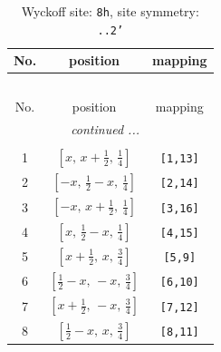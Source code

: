 \documentclass[fleqn,8pt]{jsarticle}
\begin{document}
\begin{longtable}{ccc}
\caption{Wyckoff site: {\tt 8h}, site symmetry: {\tt ..2'}}
 \\
 \hline \hline
No. & position & mapping \\ \hline \endfirsthead

\multicolumn{2}{l}{\tablename\ \thetable{}} \\
 \hline \hline
No. & position & mapping \\ \hline \endhead

 \hline \hline
\multicolumn{2}{r}{\footnotesize\it continued ...} \\ \endfoot

 \hline \hline
\multicolumn{2}{r}{} \\ \endlastfoot

1 & $\left[ x,\, x + \frac{1}{2},\, \frac{1}{4} \right]$ & {\tt [1,13]} \\ \hline
2 & $\left[ - x,\, \frac{1}{2} - x,\, \frac{1}{4} \right]$ & {\tt [2,14]} \\ \hline
3 & $\left[ - x,\, x + \frac{1}{2},\, \frac{1}{4} \right]$ & {\tt [3,16]} \\ \hline
4 & $\left[ x,\, \frac{1}{2} - x,\, \frac{1}{4} \right]$ & {\tt [4,15]} \\ \hline
5 & $\left[ x + \frac{1}{2},\, x,\, \frac{3}{4} \right]$ & {\tt [5,9]} \\ \hline
6 & $\left[ \frac{1}{2} - x,\, - x,\, \frac{3}{4} \right]$ & {\tt [6,10]} \\ \hline
7 & $\left[ x + \frac{1}{2},\, - x,\, \frac{3}{4} \right]$ & {\tt [7,12]} \\ \hline
8 & $\left[ \frac{1}{2} - x,\, x,\, \frac{3}{4} \right]$ & {\tt [8,11]} \\
\end{longtable}
\renewcommand{\arraystretch}{1.2}
\end{document}
